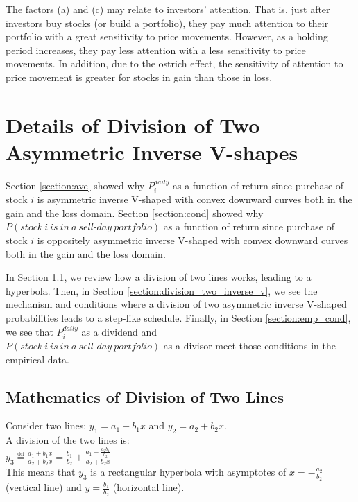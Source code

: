 \documentclass[11pt, a4paper]{article}
\begin{document}
The factors (a) and (c) may relate to investors' attention. That is, just after investors buy stocks (or build a portfolio), they pay much attention to their portfolio with a great sensitivity to price movements. However, as a holding period increases, they pay less attention with a less sensitivity to price movements. In addition, due to the ostrich effect, the sensitivity of attention to price movement is greater for stocks in gain than those in loss. 

\section{Details of Division of Two Asymmetric Inverse V-shapes}
\label{section:condition}
Section \ref{section:ave} showed why $P^{daily}_{i}$ as a function of return since purchase of stock $i$ is asymmetric inverse V-shaped with convex downward curves both in the gain and the loss domain. Section \ref{section:cond} showed why $P(stock~i~is~in~a~sell\mbox{-}day~portfolio)$ as a function of return since purchase of stock $i$ is oppositely asymmetric inverse V-shaped with convex downward curves both in the gain and the loss domain.

In Section \ref{section:division_two_lines}, we review how a division of two lines works, leading to a hyperbola. Then, in Section \ref{section:division_two_inverse_v}, we see the mechanism and conditions where a division of two asymmetric inverse V-shaped probabilities leads to a step-like schedule. Finally, in Section \ref{section:emp_cond}, we see that $P^{daily}_{i}$ as a dividend and\\ $P(stock~i~is~in~a~sell\mbox{-}day~portfolio)$ as a divisor meet those conditions in the empirical data.

\subsection{Mathematics of Division of Two Lines}
\label{section:division_two_lines}
Consider two lines: $y_1=a_1+b_1x$ and $y_2=a_2+b_2x$.\\

\noindent
A division of the two lines is:\\
$y_3 \overset{\underset{\mathrm{def}}{}}{=} \frac{a_1+b_1x}{a_2+b_2x}=\frac{b_1}{b_2}+\frac{a_1-\frac{a_2 b_1}{b_2}}{a_2+b_2x}$\\

\noindent
This means that $y_3$ is a rectangular hyperbola with asymptotes of $x=-\frac{a_2}{b_2}$ (vertical line) and $y=\frac{b_1}{b_2}$ (horizontal line). \\
\end{document}
